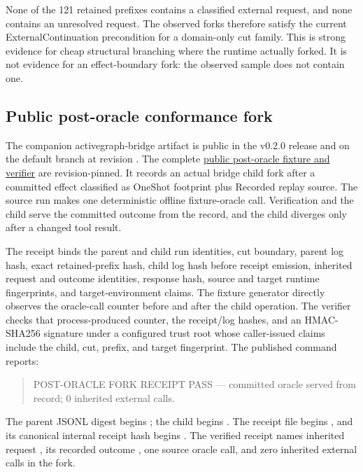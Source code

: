 None of the 121 retained prefixes contains a classified external request, and
none contains an unresolved request.  The observed forks therefore satisfy the
current ExternalContinuation precondition for a domain-only cut family.  This
is strong evidence for cheap structural branching where the runtime actually
forked.  It is not evidence for an effect-boundary fork: the observed sample
does not contain one.

\subsection{Public post-oracle conformance fork}

The companion activegraph-bridge artifact is public in the v0.2.0 release and
on the default branch at revision .  The complete
\href{https://github.com/yoheinakajima/activegraph-bridge/tree/843824a44d48d816779fc0c08580ae06108fe7b6/evidence/post-oracle-fork-v1}{public post-oracle fixture and verifier}
are revision-pinned.
It records an actual bridge child fork after a committed effect classified as
OneShot footprint plus Recorded replay source.  The source run makes one
deterministic offline fixture-oracle call.  Verification and the child serve
the committed outcome from the record, and the child diverges only after a
changed tool result.

The receipt binds the parent and child run identities, cut boundary, parent log
hash, exact retained-prefix hash, child log hash before receipt emission,
inherited request and outcome identities, response hash, source and target
runtime fingerprints, and target-environment claims.  The fixture generator
directly observes the oracle-call counter before and after the child operation.
The verifier checks that process-produced counter, the receipt/log hashes, and
an HMAC-SHA256 signature under a configured trust root whose caller-issued
claims include the child, cut, prefix, and target fingerprint.
The published command reports:

\begin{quote}
POST-ORACLE FORK RECEIPT PASS --- committed oracle served from record;
0 inherited external calls.
\end{quote}

The parent JSONL digest begins ; the child begins
.  The receipt file begins , and its
canonical internal receipt hash begins .  The verified receipt names inherited request
, its recorded outcome , one source oracle call,
and zero inherited external calls in the fork.

